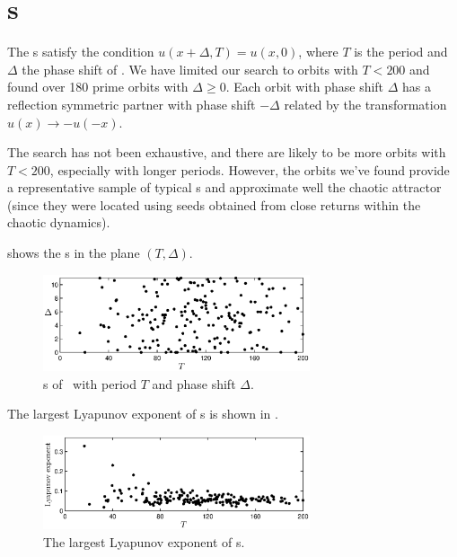 %

\section{\Rpo s}

The \rpo s satisfy the condition $u(x+\Delta,T) = u(x,0)$, where $T$
is the period and $\Delta$ the phase shift of \rpo .  We have
limited our search to orbits with $T < 200$ and found over 180 prime
orbits with $\Delta \ge 0$.  Each orbit with phase shift $\Delta$
has a reflection symmetric partner with phase shift $-\Delta$
related by the transformation $u(x) \to -u(-x)$.

The search has not been exhaustive, and there are likely to be more
orbits with $T < 200$, especially with longer periods.  However, the
orbits we've found provide a representative sample of typical \rpo s
and approximate well the chaotic attractor (since they were located
using seeds obtained from close returns within the chaotic
dynamics).

 shows the \rpo s in the plane $(T,\Delta)$.
\begin{figure}[t]
\begin{center}
\includegraphics[width=0.7\textwidth]{figs/ks22_rpos_Tdelta.eps}
\end{center}
\caption{\Rpo s of \KSe\ with period $T$ and phase shift $\Delta$.
        } \label{f:ks22rposT}
\end{figure}

The largest Lyapunov exponent of \rpo s is shown in
.

\begin{figure}[t]
\begin{center}
\includegraphics[width=0.7\textwidth]{figs/ks22_rpos_lyap.eps}
\end{center}
\caption{The largest Lyapunov exponent of \rpo s.
        } \label{f:ks22rposL}
\end{figure}

